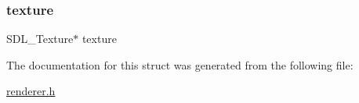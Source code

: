\mbox{\label{structrender__objects_a859b8efbf9abe8e82757ee5c75a0c97c}} 
\subsubsection{\texorpdfstring{texture}{texture}}
{\footnotesize\ttfamily S\+D\+L\+\_\+\+Texture$\ast$ texture}



The documentation for this struct was generated from the following file\+:\begin{DoxyCompactItemize}
\item 
\mbox{\hyperlink{renderer_8h}{renderer.\+h}}\end{DoxyCompactItemize}
